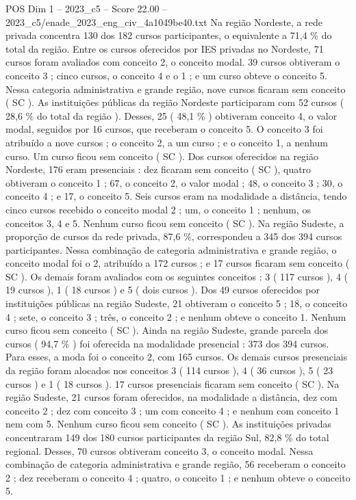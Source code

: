 \begin{textsample}{POS Dim 1 – 2023\_c5 – Score 22.00 – 2023\_c5/enade\_2023\_eng\_civ\_4a1049be40.txt}
Na região Nordeste, a rede privada concentra 130 dos 182 cursos participantes, o equivalente a 71,4 \% do total da região.
Entre os cursos oferecidos por IES privadas no Nordeste, 71 cursos foram avaliados com conceito 2, o conceito modal. 39 cursos obtiveram o conceito 3 ; cinco cursos, o conceito 4 e o 1 ; e um curso obteve o conceito 5.
Nessa categoria administrativa e grande região, nove cursos ficaram sem conceito ( SC ).
As instituições públicas da região Nordeste participaram com 52 cursos ( 28,6 \% do total da região ).
Desses, 25 ( 48,1 \% ) obtiveram conceito 4, o valor modal, seguidos por 16 cursos, que receberam o conceito 5.
O conceito 3 foi atribuído a nove cursos ; o conceito 2, a um curso ; e o conceito 1, a nenhum curso.
Um curso ficou sem conceito ( SC ).
Dos cursos oferecidos na região Nordeste, 176 eram presenciais : dez ficaram sem conceito ( SC ), quatro obtiveram o conceito 1 ; 67, o conceito 2, o valor modal ; 48, o conceito 3 ; 30, o conceito 4 ; e 17, o conceito 5.
Seis cursos eram na modalidade a distância, tendo cinco cursos recebido o conceito modal 2 ; um, o conceito 1 ; nenhum, os conceitos 3, 4 e 5.
Nenhum curso ficou sem conceito ( SC ).
Na região Sudeste, a proporção de cursos da rede privada, 87,6 \%, correspondeu a 345 dos 394 cursos participantes.
Nessa combinação de categoria administrativa e grande região, o conceito modal foi o 2, atribuído a 172 cursos ; e 17 cursos ficaram sem conceito ( SC ).
Os demais foram avaliados com os seguintes conceitos : 3 ( 117 cursos ), 4 ( 19 cursos ), 1 ( 18 cursos ) e 5 ( dois cursos ).
Dos 49 cursos oferecidos por instituições públicas na região Sudeste, 21 obtiveram o conceito 5 ; 18, o conceito 4 ; sete, o conceito 3 ; três, o conceito 2 ; e nenhum obteve o conceito 1.
Nenhum curso ficou sem conceito ( SC ).
Ainda na região Sudeste, grande parcela dos cursos ( 94,7 \% ) foi oferecida na modalidade presencial : 373 dos 394 cursos.
Para esses, a moda foi o conceito 2, com 165 cursos.
Os demais cursos presenciais da região foram alocados nos conceitos 3 ( 114 cursos ), 4 ( 36 cursos ), 5 ( 23 cursos ) e 1 ( 18 cursos ). 17 cursos presenciais ficaram sem conceito ( SC ).
Na região Sudeste, 21 cursos foram oferecidos, na modalidade a distância, dez com conceito 2 ; dez com conceito 3 ; um com conceito 4 ; e nenhum com conceito 1 nem com 5.
Nenhum curso ficou sem conceito ( SC ).
As instituições privadas concentraram 149 dos 180 cursos participantes da região Sul, 82,8 \% do total regional.
Desses, 70 cursos obtiveram conceito 3, o conceito modal.
Nessa combinação de categoria administrativa e grande região, 56 receberam o conceito 2 ; dez receberam o conceito 4 ; quatro, o conceito 1 ; e nenhum obteve o conceito 5.

\end{textsample}
